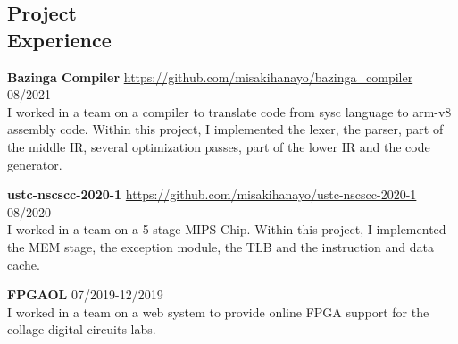 \documentclass[margin, 10pt]{res}
\begin{document}
\begin{resume}
\section{Project \\ Experience}
{\bf Bazinga Compiler} \url{https://github.com/misakihanayo/bazinga_compiler} \hfill 08/2021 \\
I worked in a team on a compiler to translate code from sysc language to arm-v8 assembly code.
Within this project, I implemented the lexer, the parser, part of the middle IR, several optimization passes, part of the lower IR and the code generator.

{\bf ustc-nscscc-2020-1} \url{https://github.com/misakihanayo/ustc-nscscc-2020-1} \hfill 08/2020 \\
I worked in a team on a 5 stage MIPS Chip. Within this project, I implemented the MEM stage,
 the exception module, the TLB and the instruction and data cache.

{\bf FPGAOL} \hfill 07/2019-12/2019 \\
I worked in a team on a web system to provide online FPGA support for the collage digital circuits labs.


\end{resume}
\end{document}
